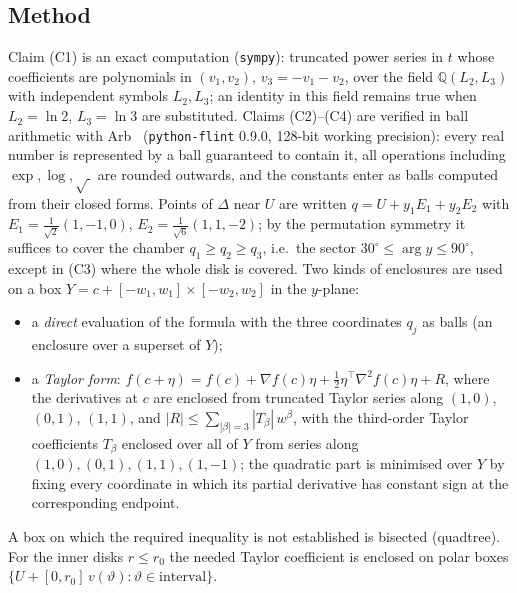 \documentclass[11pt]{article}
\theoremstyle{definition}
\numberwithin{equation}{section}
\begin{document}
\subsection{Method}
Claim (C1) is an exact computation (\texttt{sympy}): truncated power series in $t$ whose coefficients are polynomials in $(v_1,v_2)$,
$v_3=-v_1-v_2$, over the field $\mathbb Q(L_2,L_3)$ with independent symbols $L_2,L_3$; an identity in this field remains true when
$L_2=\ln2$, $L_3=\ln3$ are substituted. Claims (C2)--(C4) are verified in ball arithmetic with Arb~\cite{Arb} (\texttt{python-flint}
0.9.0, 128-bit working precision): every real number is represented by a ball guaranteed to contain it, all operations including
$\exp,\log,\sqrt{\ }$ are rounded outwards, and the constants enter as balls computed from their closed forms. Points of $\Delta$ near
$U$ are written $q=U+y_1E_1+y_2E_2$ with $E_1=\frac1{\sqrt2}(1,-1,0)$, $E_2=\frac1{\sqrt6}(1,1,-2)$; by the permutation symmetry it
suffices to cover the chamber $q_1\ge q_2\ge q_3$, i.e.\ the sector $30^\circ\le\arg y\le90^\circ$, except in (C3) where the whole disk is
covered. Two kinds of enclosures are used on a box $Y=c+[-w_1,w_1]\times[-w_2,w_2]$ in the $y$-plane:
\begin{itemize}[leftmargin=1.5em]
\item a \emph{direct} evaluation of the formula with the three coordinates $q_j$ as balls (an enclosure over a superset of $Y$);
\item a \emph{Taylor form}: $f(c+\eta)=f(c)+\nabla f(c)\eta+\frac12\eta^\top\nabla^2f(c)\eta+R$, where the derivatives at $c$ are enclosed
from truncated Taylor series along $(1,0)$, $(0,1)$, $(1,1)$, and $|R|\le\sum_{|\beta|=3}|T_\beta|\,w^\beta$, with the third-order Taylor
coefficients $T_\beta$ enclosed over all of $Y$ from series along $(1,0),(0,1),(1,1),(1,-1)$; the quadratic part is minimised over $Y$ by
fixing every coordinate in which its partial derivative has constant sign at the corresponding endpoint.
\end{itemize}
A box on which the required inequality is not established is bisected (quadtree). For the inner disks $r\le r_0$ the needed Taylor
coefficient is enclosed on polar boxes $\{U+[0,r_0]\,v(\vartheta):\vartheta\in\text{interval}\}$.
\end{document}
